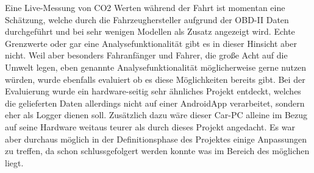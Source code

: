 \newline
Eine Live-Messung von CO2 Werten während der Fahrt ist momentan eine Schätzung, welche durch die Fahrzeughersteller aufgrund der OBD-II Daten durchgeführt und bei sehr wenigen Modellen als Zusatz angezeigt wird. Echte Grenzwerte oder gar eine Analysefunktionalität gibt es in dieser Hinsicht aber nicht.
\newline
\newline
Weil aber besonders Fahranfänger und Fahrer, die große Acht auf die Umwelt legen, eben genannte Analysefunktionalität möglicherweise gerne nutzen würden, wurde ebenfalls evaluiert ob es diese Möglichkeiten bereits gibt.
Bei der Evaluierung wurde ein hardware-seitig sehr ähnliches Projekt entdeckt, welches die gelieferten Daten allerdings nicht auf einer Android\textregistered App verarbeitet, sondern eher als Logger dienen soll.\cite{LowBudget.CarPC} 
\newline
Zusätzlich dazu wäre dieser Car-PC alleine im Bezug auf seine Hardware weitaus teurer als durch dieses Projekt angedacht. Es war aber durchaus möglich in der Definitionsphase des Projektes einige Anpassungen zu treffen, da schon schlussgefolgert werden konnte was im Bereich des möglichen liegt. 
\newline

